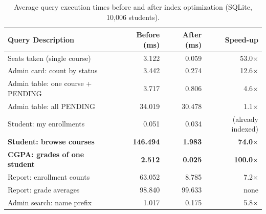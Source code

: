 \begin{table}[H]
\centering
\small
\begin{tabular}{|l|r|r|r|}
\hline
\textbf{Query Description} & \textbf{Before (ms)} & \textbf{After (ms)} & \textbf{Speed-up} \\ \hline
Seats taken (single course) & 3.122 & 0.059 & 53.0$\times$ \\ \hline
Admin card: count by status & 3.442 & 0.274 & 12.6$\times$ \\ \hline
Admin table: one course + PENDING & 3.717 & 0.806 & 4.6$\times$ \\ \hline
Admin table: all PENDING & 34.019 & 30.478 & 1.1$\times$ \\ \hline
Student: my enrollments & 0.051 & 0.034 & (already indexed) \\ \hline
\textbf{Student: browse courses} & \textbf{146.494} & \textbf{1.983} & \textbf{74.0$\times$} \\ \hline
\textbf{CGPA: grades of one student} & \textbf{2.512} & \textbf{0.025} & \textbf{100.0$\times$} \\ \hline
Report: enrollment counts & 63.052 & 8.785 & 7.2$\times$ \\ \hline
Report: grade averages & 98.840 & 99.633 & none \\ \hline
Admin search: name prefix & 1.017 & 0.175 & 5.8$\times$ \\ \hline
\end{tabular}
\caption{Average query execution times before and after index optimization (SQLite, 10{,}006 students).}
\label{tab:profiling-results}
\end{table}

